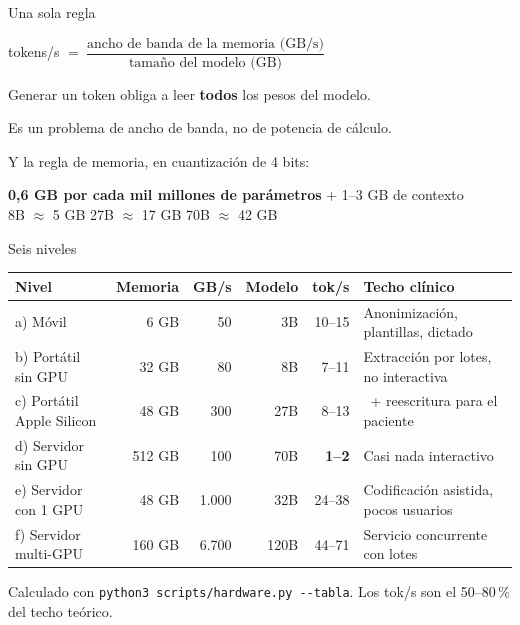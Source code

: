 \documentclass[aspectratio=169,11pt]{beamer}
\newcommand{\mal}[1]{\textcolor{acento}{\textbf{#1}}}
\begin{document}
\begin{frame}{Una sola regla}
  \vspace{.5em}
  \begin{center}
    {\Large tokens/s $=\ \dfrac{\text{ancho de banda de la memoria (GB/s)}}{\text{tamaño del modelo (GB)}}$}
  \end{center}
  \vspace{1.2em}
  Generar un token obliga a leer \textbf{todos} los pesos del modelo.
  \vspace{.6em}

  Es un problema de \alert{ancho de banda}, no de potencia de cálculo.
  \vspace{1em}
  \pause

  Y la regla de memoria, en cuantización de 4 bits:
  \begin{center}
    \textbf{0,6 GB por cada mil millones de parámetros} $+$ 1--3 GB de contexto\\[.4em]
    8B $\approx$ 5 GB \qquad 27B $\approx$ 17 GB \qquad 70B $\approx$ 42 GB
  \end{center}
\end{frame}

\begin{frame}{Seis niveles}
  \centering\scriptsize
  \begin{tabular}{@{}lrrrrl@{}}
    \toprule
    \textbf{Nivel} & \textbf{Memoria} & \textbf{GB/s} & \textbf{Modelo} & \textbf{tok/s} & \textbf{Techo clínico} \\
    \midrule
    a) Móvil & 6 GB & 50 & 3B & 10--15 & Anonimización, plantillas, dictado \\
    b) Portátil sin GPU & 32 GB & 80 & 8B & 7--11 & Extracción por lotes, no interactiva \\
    c) Portátil Apple Silicon & 48 GB & 300 & 27B & 8--13 & \ + reescritura para el paciente \\
    \rowcolor{black!8}
    d) Servidor sin GPU & 512 GB & 100 & 70B & \mal{1--2} & Casi nada interactivo \\
    e) Servidor con 1 GPU & 48 GB & 1.000 & 32B & 24--38 & Codificación asistida, pocos usuarios \\
    f) Servidor multi-GPU & 160 GB & 6.700 & 120B & 44--71 & Servicio concurrente con lotes \\
    \bottomrule
  \end{tabular}

  \vspace{1em}
  \footnotesize Calculado con \texttt{python3 scripts/hardware.py -{}-tabla}.
  Los tok/s son el 50--80\,\% del techo teórico.
\end{frame}
\end{document}
